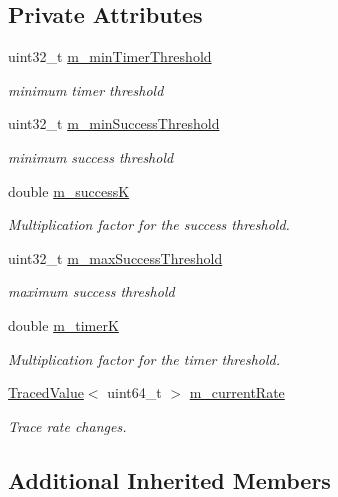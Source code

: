 \subsection*{Private Attributes}
\begin{DoxyCompactItemize}
\item 
uint32\+\_\+t \hyperlink{classns3_1_1AarfWifiManager_a87cd21fd98cc5330f70cb3960f5acca4}{m\+\_\+min\+Timer\+Threshold}
\begin{DoxyCompactList}\small\item\em minimum timer threshold \end{DoxyCompactList}\item 
uint32\+\_\+t \hyperlink{classns3_1_1AarfWifiManager_a08955e01de046ef922862c4747ecc855}{m\+\_\+min\+Success\+Threshold}
\begin{DoxyCompactList}\small\item\em minimum success threshold \end{DoxyCompactList}\item 
double \hyperlink{classns3_1_1AarfWifiManager_a37e881b1ae22c8c7fd4fca36e027117a}{m\+\_\+successK}
\begin{DoxyCompactList}\small\item\em Multiplication factor for the success threshold. \end{DoxyCompactList}\item 
uint32\+\_\+t \hyperlink{classns3_1_1AarfWifiManager_a66100481b6ec3a506ef0fbea3de7cb7d}{m\+\_\+max\+Success\+Threshold}
\begin{DoxyCompactList}\small\item\em maximum success threshold \end{DoxyCompactList}\item 
double \hyperlink{classns3_1_1AarfWifiManager_a3d4f7898576f87f739dd0f3746387bd1}{m\+\_\+timerK}
\begin{DoxyCompactList}\small\item\em Multiplication factor for the timer threshold. \end{DoxyCompactList}\item 
\hyperlink{classns3_1_1TracedValue}{Traced\+Value}$<$ uint64\+\_\+t $>$ \hyperlink{classns3_1_1AarfWifiManager_aaf593968aa9acd2292b0be08930d8c9f}{m\+\_\+current\+Rate}
\begin{DoxyCompactList}\small\item\em Trace rate changes. \end{DoxyCompactList}\end{DoxyCompactItemize}
\subsection*{Additional Inherited Members}


